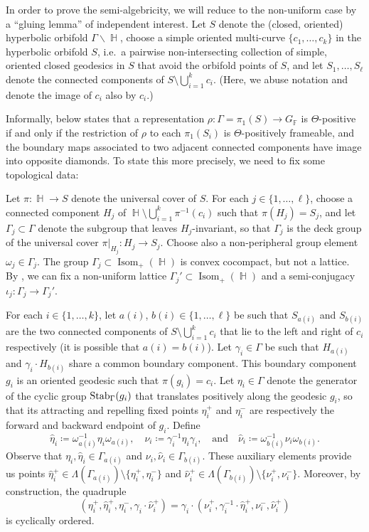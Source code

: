 \documentclass{amsart}
\theoremstyle{plain}
\theoremstyle{definition}
\DeclareMathOperator{\Isom}{Isom}
\DeclareMathOperator{\Fb}{{\mathbb{F}}}
\DeclareMathOperator{\Hb}{\mathbb{H}}
\newcommand{\Stab}{\textnormal{Stab}}
\newcommand{\1}{\mathbf{1}}
\begin{document}
In order to prove the semi-algebricity, we will reduce to the non-uniform case by a ``gluing lemma'' of independent interest. Let $S$ denote the (closed, oriented) hyperbolic orbifold $\Gamma \backslash \Hb$, choose a simple oriented multi-curve $\{c_1,\dots,c_k\}$ in the hyperbolic orbifold $S$, i.e.\ a pairwise non-intersecting collection of simple, oriented closed geodesics in $S$ that avoid the orbifold points of $S$, and let $S_1,\dots,S_\ell$ denote the connected components of $S\setminus\bigcup_{i=1}^k c_i$.
(Here, we abuse notation and denote the image of $c_i$ also by $c_i$.)

Informally,  below states that a representation $\rho\colon \Gamma = \pi_1(S) \to G_{\Fb}$ is $\Theta$-positive if and only if the restriction of $\rho$ to each $\pi_1(S_i)$ is $\Theta$-positively frameable, and the boundary maps associated to two adjacent connected components have image into opposite diamonds. To state this more precisely, we need to fix some topological data:

Let $\pi\colon \Hb\to S$ denote the universal cover of $S$. For each $j\in\{1,\dots,\ell\}$, choose a connected component $H_j$ of $\Hb\setminus\bigcup_{i=1}^k \pi^{-1}(c_i)$ such that $\pi(H_j) = S_j$, and let $\Gamma_j\subset\Gamma$ denote the subgroup that leaves $H_j$-invariant, so that $\Gamma_j$ is the deck group of the universal cover $\pi|_{H_j} \colon H_j\to S_j$.
Choose also a non-peripheral group element $\omega_j\in\Gamma_j$.
The group $\Gamma_j \subset \Isom_+(\Hb)$ is convex cocompact, but not a lattice.
By , we can fix a non-uniform lattice $\Gamma_j'\subset \Isom_+(\Hb)$ and a semi-conjugacy $\iota_j\colon\Gamma_j\to\Gamma_j'$. 

For each $i\in\{1,\dots,k\}$, let $a(i)$, $b(i)\in\{1,\dots,\ell\}$ be such that $S_{a(i)}$ and $S_{b(i)}$ are the two connected components of $S\setminus\bigcup_{i=1}^kc_i$ that lie to the left and right of $c_i$ respectively (it is possible that $a(i)=b(i)$). Let $\gamma_i\in\Gamma$ be such that $H_{a(i)}$ and $\gamma_i\cdot H_{b(i)}$ share a common boundary component. This boundary component $g_i$ is an oriented geodesic such that $\pi(g_i)= c_i$. Let  $\eta_i\in\Gamma$ denote the generator of the cyclic group $\Stab_\Gamma(g_i)$ that translates positively along the geodesic $g_i$, so that its attracting and repelling fixed points $\eta_i^+$ and $\eta_i^-$ are respectively the forward and backward endpoint of $g_i$. Define
\[\hat\eta_i\coloneqq \omega_{a(i)}^{-1}\eta_i\omega_{a(i)},\quad\nu_i\coloneqq \gamma_i^{-1}\eta_i\gamma_i,\quad\text{and}\quad \hat\nu_i\coloneqq \omega_{b(i)}^{-1}\nu_i\omega_{b(i)}.\]
Observe that $\eta_i,\hat\eta_i\in\Gamma_{a(i)}$ and $\nu_i,\hat\nu_i\in\Gamma_{b(i)}$. These auxiliary elements provide us points $\hat{\eta}_i^+ \in \Lambda(\Gamma_{a(i)})\setminus \{\eta_i^+,\eta_i^-\}$ and $\hat \nu_i^+ \in \Lambda(\Gamma_{b(i)})\setminus \{\nu_i^+, \nu_i^-\}$. Moreover, by construction, the quadruple \[(\eta_i^+,\hat\eta_i^+,\eta_i^-,\gamma_i\cdot\hat\nu_i^+)=\gamma_i\cdot(\nu_i^+,\gamma_i^{-1}\cdot\hat\eta_i^+,\nu_i^-,\hat\nu_i^+)\]
is cyclically ordered. 
\end{document}
